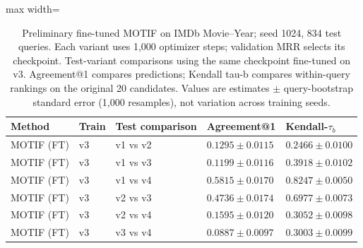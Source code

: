 \begin{table}[htbp]
\centering
\small
\renewcommand{\arraystretch}{1.15}
\setlength{\tabcolsep}{5pt}
\begin{adjustbox}{max width=\linewidth}
\begin{tabular}{|l|l|l|l|l|}
\hline
\textbf{Method} & \textbf{Train} & \textbf{Test comparison} & \textbf{Agreement@1} & \textbf{Kendall-$\tau_b$} \\
\hline
MOTIF (FT) & v3 & v1 vs v2 & $0.1295 \pm 0.0115$ & $0.2466 \pm 0.0100$ \\
\hline
MOTIF (FT) & v3 & v1 vs v3 & $0.1199 \pm 0.0116$ & $0.3918 \pm 0.0102$ \\
\hline
MOTIF (FT) & v3 & v1 vs v4 & $0.5815 \pm 0.0170$ & $0.8247 \pm 0.0050$ \\
\hline
MOTIF (FT) & v3 & v2 vs v3 & $0.4736 \pm 0.0174$ & $0.6977 \pm 0.0073$ \\
\hline
MOTIF (FT) & v3 & v2 vs v4 & $0.1595 \pm 0.0120$ & $0.3052 \pm 0.0098$ \\
\hline
MOTIF (FT) & v3 & v3 vs v4 & $0.0887 \pm 0.0097$ & $0.3003 \pm 0.0099$ \\
\hline
\end{tabular}
\end{adjustbox}
\caption{Preliminary fine-tuned MOTIF on IMDb Movie--Year; seed 1024, 834 test queries. Each variant uses 1,000 optimizer steps; validation MRR selects its checkpoint. Test-variant comparisons using the same checkpoint fine-tuned on v3. Agreement@1 compares predictions; Kendall tau-b compares within-query rankings on the original 20 candidates. Values are estimates $\pm$ query-bootstrap standard error (1,000 resamples), not variation across training seeds.}
\label{tab:motif-imdb-movie-year-matrix-transfer-comparisons-v3}
\end{table}

